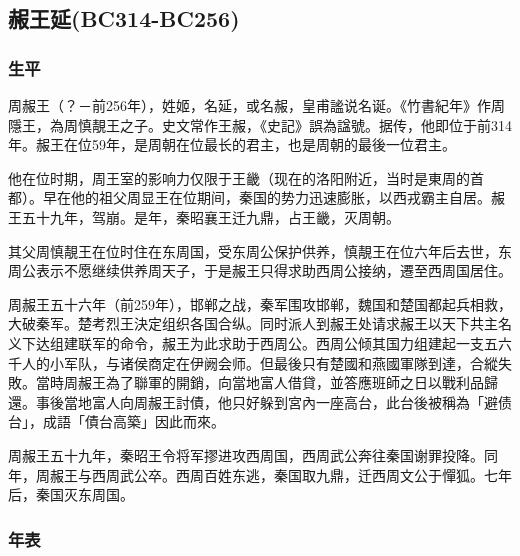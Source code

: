 
\subsection{赧王延{\tiny(BC314-BC256)}}

\subsubsection{生平}

周赧王（？－前256年），姓姬，名延，或名赧，皇甫謐说名诞。《竹書紀年》作周隱王，為周慎靚王之子。史文常作王赧，《史記》誤為諡號。据传，他即位于前314年。赧王在位59年，是周朝在位最长的君主，也是周朝的最後一位君主。

他在位时期，周王室的影响力仅限于王畿（现在的洛阳附近，当时是東周的首都）。早在他的祖父周显王在位期间，秦国的势力迅速膨胀，以西戎霸主自居。赧王五十九年，驾崩。是年，秦昭襄王迁九鼎，占王畿，灭周朝。

其父周慎靚王在位时住在东周国，受东周公保护供养，慎靚王在位六年后去世，东周公表示不愿继续供养周天子，于是赧王只得求助西周公接纳，遷至西周国居住。

周赧王五十六年（前259年），邯郸之战，秦军围攻邯郸，魏国和楚国都起兵相救，大破秦军。楚考烈王決定组织各国合纵。同时派人到赧王处请求赧王以天下共主名义下达组建联军的命令，赧王为此求助于西周公。西周公倾其国力组建起一支五六千人的小军队，与诸侯商定在伊阙会师。但最後只有楚國和燕國軍隊到達，合縱失敗。當時周赧王為了聯軍的開銷，向當地富人借貸，並答應班師之日以戰利品歸還。事後當地富人向周赧王討債，他只好躲到宮內一座高台，此台後被稱為「避债台」，成語「債台高築」因此而來。

周赧王五十九年，秦昭王令将军摎进攻西周国，西周武公奔往秦国谢罪投降。同年，周赧王与西周武公卒。西周百姓东逃，秦国取九鼎，迁西周文公于憚狐。七年后，秦国灭东周国。

\subsubsection{年表}

